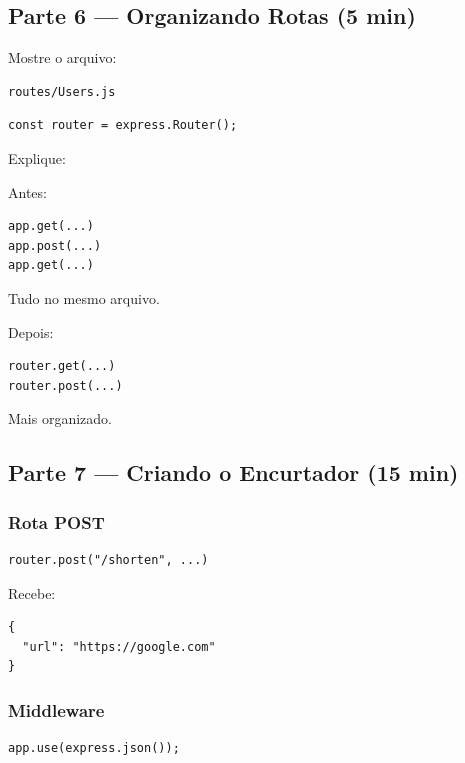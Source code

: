 \documentclass[a4paper,12pt]{article}
\begin{document}
\subsection{Parte 6 --- Organizando Rotas (5 min)}

Mostre o arquivo:

\begin{verbatim}
routes/Users.js
\end{verbatim}

\begin{verbatim}
const router = express.Router();
\end{verbatim}

Explique:

Antes:

\begin{verbatim}
app.get(...)
app.post(...)
app.get(...)
\end{verbatim}

Tudo no mesmo arquivo.

Depois:

\begin{verbatim}
router.get(...)
router.post(...)
\end{verbatim}

Mais organizado.

\subsection{Parte 7 --- Criando o Encurtador (15 min)}

\subsubsection{Rota POST}

\begin{verbatim}
router.post("/shorten", ...)
\end{verbatim}

Recebe:

\begin{verbatim}
{
  "url": "https://google.com"
}
\end{verbatim}

\subsubsection{Middleware}

\begin{verbatim}
app.use(express.json());
\end{verbatim}
\end{document}
